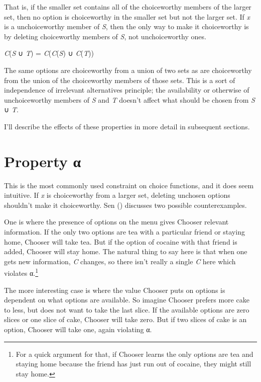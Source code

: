\documentclass[
  11pt,
  letterpaper,
  DIV=11,
  numbers=noendperiod,
  twoside]{scrartcl}
\providecommand{\tightlist}{%
  \setlength{\itemsep}{0pt}\setlength{\parskip}{0pt}}
\begin{document}
That is, if the smaller set contains all of the choiceworthy members of
the larger set, then no option is choiceworthy in the smaller set but
not the larger set. If \emph{x} is a unchoiceworthy member of \emph{S},
then the only way to make it choiceworthy is by deleting choiceworthy
members of \emph{S}, not unchoiceworthy ones.

\begin{description}
\tightlist
\item[Path Independence]
\emph{C}(\emph{S} ∪ \emph{T}) = \emph{C}(\emph{C}(\emph{S}) ∪
\emph{C}(\emph{T}))
\end{description}

The same options are choiceworthy from a union of two sets as are
choiceworthy from the union of the choiceworthy members of those sets.
This is a sort of independence of irrelevant alternatives principle; the
availability or otherwise of unchoiceworthy members of \emph{S} and
\emph{T} doesn't affect what should be chosen from \emph{S} ∪ \emph{T}.

I'll describe the effects of these properties in more detail in
subsequent sections.

\section{Property α}\label{sec-alpha}

This is the most commonly used constraint on choice functions, and it
does seem intuitive. If \emph{x} is choiceworthy from a larger set,
deleting unchosen options shouldn't make it choiceworthy. Sen
() discusses two
possible counterexamples.

One is where the presence of options on the menu gives Chooser relevant
information. If the only two options are tea with a particular friend or
staying home, Chooser will take tea. But if the option of cocaine with
that friend is added, Chooser will stay home. The natural thing to say
here is that when one gets new information, \emph{C} changes, so there
isn't really a single \emph{C} here which violates α.\footnote{For a
  quick argument for that, if Chooser learns the only options are tea
  and staying home because the friend has just run out of cocaine, they
  might still stay home.}

The more interesting case is where the value Chooser puts on options is
dependent on what options are available. So imagine Chooser prefers more
cake to less, but does not want to take the last slice. If the available
options are zero slices or one slice of cake, Chooser will take zero.
But if two slices of cake is an option, Chooser will take one, again
violating α.
\end{document}
